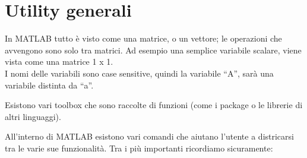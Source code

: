 \chapter{Utility generali}
In MATLAB tutto è visto come una matrice, o un vettore; le operazioni che avvengono sono solo tra matrici.
Ad esempio una semplice variabile scalare, viene vista come una matrice 1 x 1. \\

I nomi delle variabili sono case sensitive, quindi la variabile ``A'', sarà una variabile distinta da ``a''.

Esistono vari toolbox che sono raccolte di funzioni (come i package o le librerie di altri linguaggi).

All'interno di MATLAB esistono vari comandi che aiutano l'utente a districarsi tra le varie sue funzionalità.
Tra i più importanti ricordiamo sicuramente:


